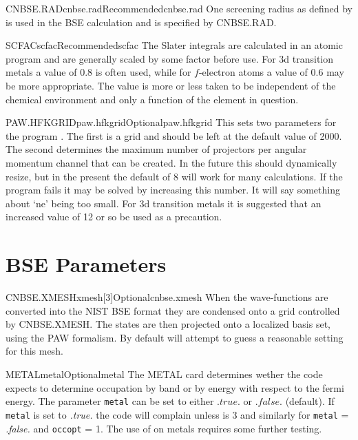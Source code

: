 \documentclass[11pt]{report}
\begin{document}
\begin{Card}{CNBSE.RAD}{cnbse.rad}{Recommended}{cnbse.rad}
One screening radius as defined by  is used in the BSE calculation and is specified by CNBSE.RAD. 
\end{Card}

\begin{Card}{SCFAC}{scfac}{Recommended}{scfac}
The Slater integrals are calculated in an atomic program and are generally scaled by some factor before use. For 3d transition metals a value of $0.8$ is often used, while for $f$-electron atoms a value of $0.6$ may be more appropriate. The value is more or less taken to be independent of the chemical environment and only a function of the element in question.
\end{Card}

\begin{Card}{PAW.HFKGRID}{paw.hfkgrid}{Optional}{paw.hfkgrid}
This sets two parameters for the program . The first is a grid and should be left at the default value of 2000. The second determines the maximum number of projectors per angular momentum channel that can be created. In the future this should dynamically resize, but in the present the default of 8 will work for many calculations. If the program  fails it may be solved by increasing this number. It will say something about `ne' being too small. For 3d transition metals it is suggested that an increased value of 12 or so be used as a precaution.  
\end{Card}


\section{BSE Parameters}
\label{sec:BSE-Parameters}

\begin{Card}{CNBSE.XMESH}{xmesh[3]}{Optional}{cnbse.xmesh}
When the wave-functions are converted into the NIST BSE format they are condensed onto a grid controlled by CNBSE.XMESH. The states are then projected onto a localized basis set, using the PAW formalism. By default \OCEAN{} will attempt to guess a reasonable 
setting for this mesh. 
\end{Card}

\begin{Card}{METAL}{metal}{Optional}{metal}
The METAL card determines wether the code expects to determine occupation by band or by energy with respect to the fermi energy. The parameter \texttt{metal} can be set to either $.true.$ or $.false.$ (default). If \texttt{metal} is set to {\it .true.} the code will complain unless  is 3 and similarly for \texttt{metal} = {\it .false.} and \texttt{occopt} = 1. The use of \OCEAN{} on metals requires some further testing. 
\end{Card}
\end{document}
